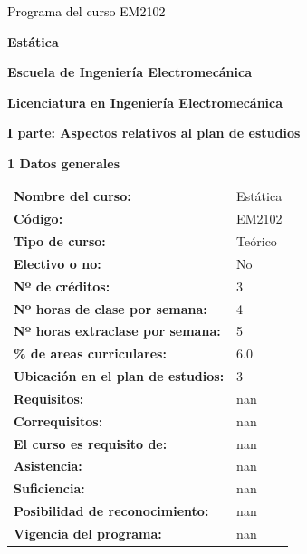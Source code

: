 \documentclass[letterpaper]{article}%
\begin{document}
%
\normalsize%
\thispagestyle{empty}%
%
\vspace*{150mm}%
\par\fontsize{14}{0}\selectfont \textcolor{black}{Programa del curso EM2102}%
\par\fontsize{18}{25}\selectfont \textbf{\textcolor{azulsuaveTEC}{Estática}}%
\par\hspace*{10mm}\fontsize{12}{30}\selectfont \textbf{\textcolor{gris}{Escuela de Ingeniería Electromecánica}}%
\par\hspace*{10mm}\fontsize{12}{14}\selectfont \textbf{\textcolor{gris}{Licenciatura en Ingeniería Electromecánica}}%
\newpage%
\pagestyle{headfoot}%
\par\fontsize{14}{0}\selectfont \textbf{\textcolor{parte}{I parte: Aspectos relativos al plan de estudios}}%
\par\hspace*{4mm}\fontsize{12}{20}\selectfont \textbf{\textcolor{parte}{1 Datos generales}}%
\renewcommand{\arraystretch}{1.5}%
\begin{longtable}{m{7cm}m{9cm}}%
\textbf{Nombre del curso:}&Estática\\%
\textbf{Código:}&EM2102\\%
\textbf{Tipo de curso:}&Teórico\\%
\textbf{Electivo o no:}&No\\%
\textbf{Nº de créditos:}&3\\%
\textbf{Nº horas de clase por semana:}&4\\%
\textbf{Nº horas extraclase por semana:}&5\\%
\textbf{\% de areas curriculares:}&6.0\\%
\textbf{Ubicación en el plan de estudios:}&3\\%
\textbf{Requisitos:}&nan\\%
\textbf{Correquisitos:}&nan\\%
\textbf{El curso es requisito de:}&nan\\%
\textbf{Asistencia:}&nan\\%
\textbf{Suficiencia:}&nan\\%
\textbf{Posibilidad de reconocimiento:}&nan\\%
\textbf{Vigencia del programa:}&nan\\%
\end{longtable}%
\end{document}
